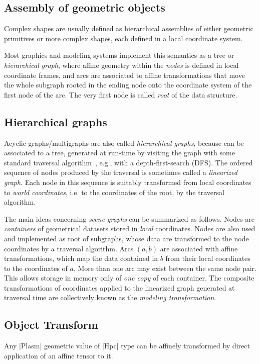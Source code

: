 \begin{coding}
\section{Assembly of geometric objects}\label{sect:4-3}

Complex shapes are usually defined as hierarchical assemblies of either geometric primitives or more  complex shapes, each defined in a local coordinate system. 

Most graphics and modeling systems implement this semantics as a tree or \emph{hierarchical graph}, where affine geometry within the \emph{nodes} is defined in local coordinate frames, and arcs are associated to affine transformations that move the whole subgraph rooted in the ending node onto the coordinate system of the first node of the arc. The very first node is called \emph{root} of the data structure.


\subsection{Hierarchical graphs}

Acyclic graphs/multigraphs are also called \emph{hierarchical graphs}, because can be associated to a tree, generated at run-time by visiting the graph with some standard traversal algorithm~\cite{10.5555/1614191}, e.g., with a depth-first-search (DFS).  The ordered sequence of nodes produced by the traversal is sometimes called a \emph{linearized graph}.  Each node in this sequence is suitably transformed from local coordinates to \emph{world coordinates}, i.e. to the coordinates of the root, by the traversal algorithm.

The main ideas concerning \emph{scene graphs} can be summarized as
follows.
Nodes are  \emph{containers} of geometrical datasets stored in
\emph{local} coordinates.  Nodes are also used and implemented as root of subgraphs, 
whose data are transformed to the node coordinates by a traversal
algorithm.
Arcs $(a,b)$ are associated with affine transformations, which map the
data contained in $b$ from their local coordinates to the coordinates
of $a$.  More than one arc may exist between the same node pair.  This
allows storage in memory only of \emph{one copy} of each container.
The composite transformations of coordinates applied to the linearized
graph generated at traversal time are collectively known as the
\emph{modeling transformation}.


\subsection*{Object Transform}\label{sect:4-3-1} Any |Plasm| geometric value of |Hpc| type can be affinely transformed by direct application of an affine tensor to it.


\end{coding}
